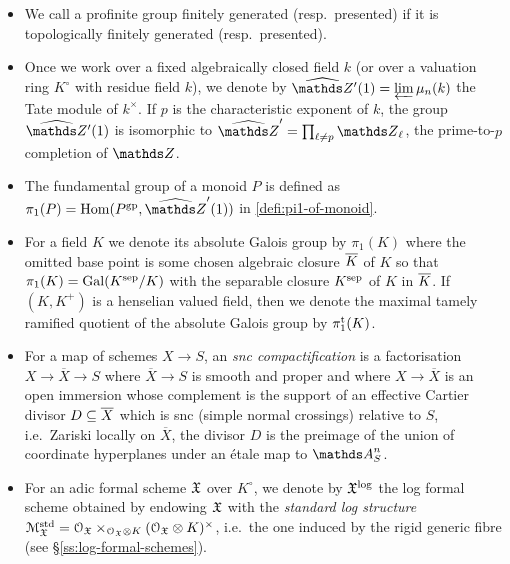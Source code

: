 \begin{itemize}[leftmargin=*]
    \item We call a profinite group finitely generated (resp.~presented) if it is topologically finitely generated (resp.~presented).
    
    \item 
    Once we work over a fixed algebraically closed field $k$ (or over a valuation ring $K^\circ$ with residue field $k$), we denote by $\hZ{}'(1) = \varprojlim \mu_n(k)$ the Tate module of $k^\times$. If $p$ is the characteristic exponent of $k$, the group $\hZ{}'(1)$ is isomorphic to $\hZ' = \prod_{\ell\neq p}\bZ_\ell$, the prime-to-$p$ completion of $\bZ$.

    \item 
    The fundamental group of a monoid $P$ is defined  as $\pi_1(P) = \Hom(P^{\rm gp}, \widehat{\bZ}'(1))$ in \cref{defi:pi1-of-monoid}.
    \item 
    For a field $K$ we denote its absolute Galois group by $\pi_1(K)$ where the omitted base point is some chosen algebraic closure $\overline{K}$ of $K$ so that $\pi_1(K) = \operatorname{Gal}(K^{\rm sep}/K)$ with the separable closure $K^{\rm sep}$ of $K$ in $\overline{K}$. If $(K,K^+)$ is a henselian valued field, then we denote the maximal tamely ramified quotient of the absolute Galois group by $\pi_1^{\mathrm{t}}(K)$.

    \item For a map of schemes $X\to S$, an \emph{snc compactification} is a factorisation $X\to \overline{X}\to S$ where $\overline{X}\to S$ is smooth and proper and where $X\to \overline{X}$ is an open immersion whose complement is the support of an effective Cartier divisor $D\subseteq \overline{X}$ which is snc (simple normal crossings) relative to $S$, i.e.\ Zariski locally on $\overline{X}$, the divisor $D$ is the preimage of the union of coordinate hyperplanes under an \'etale map to $\bA^n_S$.

    \item For an adic formal scheme ${\mathfrak{X}}$ over $K^\circ$, we denote by ${\mathfrak{X}}^{\rm log}$ the log formal scheme obtained by endowing ${\mathfrak{X}}$ with the \emph{standard log structure} ${\mathcal M}_{\mathfrak{X}}^{\rm std}={\mathcal O}_{\mathfrak{X}}\times_{{\mathcal O}_{\mathfrak{X}}\otimes K} ({\mathcal O}_{\mathfrak{X}}\otimes K)^\times$, i.e.\ the one induced by the rigid generic fibre (see \S\ref{ss:log-formal-schemes}). 

\end{itemize}


